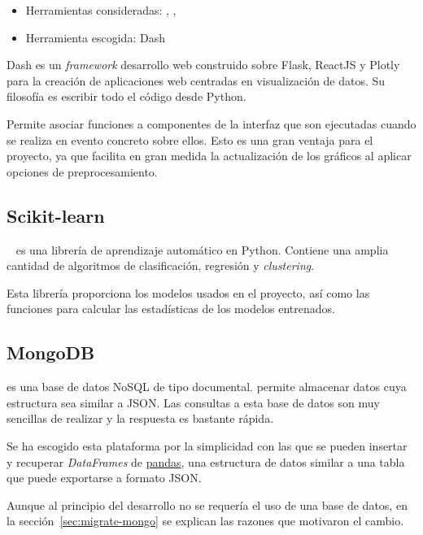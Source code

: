 \begin{itemize}
	\tightlist
	\item Herramientas consideradas: ,
	,
	\item Herramienta escogida: Dash
\end{itemize}

Dash es un \textit{framework} desarrollo web construido sobre Flask, ReactJS y
Plotly para la creación de aplicaciones web centradas en visualización de datos.
Su filosofía es escribir todo el código desde Python.

Permite asociar funciones a componentes de la interfaz que son ejecutadas cuando
se realiza en evento concreto sobre ellos. Esto es una gran ventaja para el
proyecto, ya que facilita en gran medida la actualización de los gráficos al
aplicar opciones de preprocesamiento.

\subsection{Scikit-learn}

~\cite{art:scikit-learn} es
una librería de aprendizaje automático en Python. Contiene una amplia cantidad
de algoritmos de clasificación, regresión y \textit{clustering}.

Esta librería proporciona los modelos usados en el proyecto, así como las
funciones para calcular las estadísticas de los modelos entrenados.

\subsection{MongoDB}

 es una base de datos NoSQL de
tipo documental. permite almacenar datos cuya estructura sea similar a JSON. Las
consultas a esta base de datos son muy sencillas de realizar y la respuesta es
bastante rápida.

Se ha escogido esta plataforma por la simplicidad con las que se pueden insertar
y recuperar \textit{DataFrames} de \href{https://pandas.pydata.org/}{pandas},
una estructura de datos similar a una tabla que puede exportarse a formato JSON.

Aunque al principio del desarrollo no se requería el uso de una base de datos,
en la sección~\ref{sec:migrate-mongo} se explican las razones que motivaron el
cambio.


